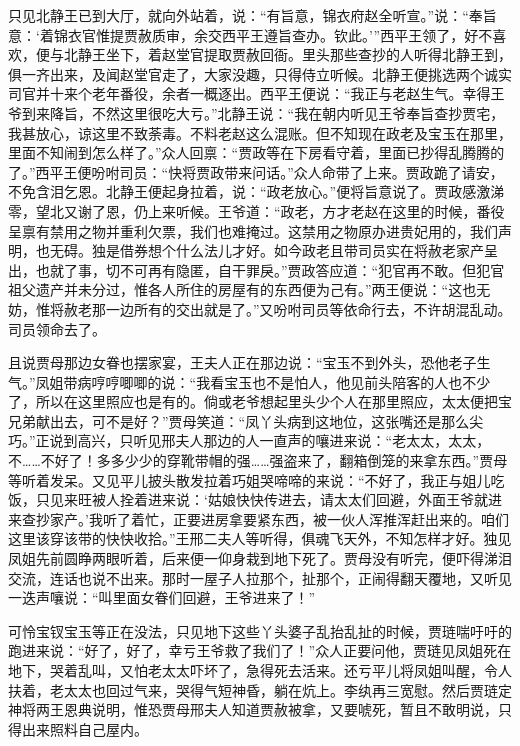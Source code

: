 \begin{parag}
    只见北静王已到大厅，就向外站着，说：“有旨意，锦衣府赵全听宣。”说：“奉旨意：‘着锦衣官惟提贾赦质审，余交西平王遵旨查办。钦此。’”西平王领了，好不喜欢，便与北静王坐下，着赵堂官提取贾赦回衙。里头那些查抄的人听得北静王到，俱一齐出来，及闻赵堂官走了，大家没趣，只得侍立听候。北静王便挑选两个诚实司官并十来个老年番役，余者一概逐出。西平王便说：“我正与老赵生气。幸得王爷到来降旨，不然这里很吃大亏。”北静王说：“我在朝内听见王爷奉旨查抄贾宅，我甚放心，谅这里不致荼毒。不料老赵这么混账。但不知现在政老及宝玉在那里，里面不知闹到怎么样了。”众人回禀：“贾政等在下房看守着，里面已抄得乱腾腾的了。”西平王便吩咐司员：“快将贾政带来问话。”众人命带了上来。贾政跪了请安，不免含泪乞恩。北静王便起身拉着，说：“政老放心。”便将旨意说了。贾政感激涕零，望北又谢了恩，仍上来听候。王爷道：“政老，方才老赵在这里的时候，番役呈禀有禁用之物并重利欠票，我们也难掩过。这禁用之物原办进贵妃用的，我们声明，也无碍。独是借券想个什么法儿才好。如今政老且带司员实在将赦老家产呈出，也就了事，切不可再有隐匿，自干罪戾。”贾政答应道：“犯官再不敢。但犯官祖父遗产并未分过，惟各人所住的房屋有的东西便为己有。”两王便说：“这也无妨，惟将赦老那一边所有的交出就是了。”又吩咐司员等依命行去，不许胡混乱动。司员领命去了。
\end{parag}


\begin{parag}
    且说贾母那边女眷也摆家宴，王夫人正在那边说：“宝玉不到外头，恐他老子生气。”凤姐带病哼哼唧唧的说：“我看宝玉也不是怕人，他见前头陪客的人也不少了，所以在这里照应也是有的。倘或老爷想起里头少个人在那里照应，太太便把宝兄弟献出去，可不是好？”贾母笑道：“凤丫头病到这地位，这张嘴还是那么尖巧。”正说到高兴，只听见邢夫人那边的人一直声的嚷进来说：“老太太，太太，不……不好了！多多少少的穿靴带帽的强……强盗来了，翻箱倒笼的来拿东西。”贾母等听着发呆。又见平儿披头散发拉着巧姐哭啼啼的来说：“不好了，我正与姐儿吃饭，只见来旺被人拴着进来说：‘姑娘快快传进去，请太太们回避，外面王爷就进来查抄家产。’我听了着忙，正要进房拿要紧东西，被一伙人浑推浑赶出来的。咱们这里该穿该带的快快收拾。”王邢二夫人等听得，俱魂飞天外，不知怎样才好。独见凤姐先前圆睁两眼听着，后来便一仰身栽到地下死了。贾母没有听完，便吓得涕泪交流，连话也说不出来。那时一屋子人拉那个，扯那个，正闹得翻天覆地，又听见一迭声嚷说：“叫里面女眷们回避，王爷进来了！”
\end{parag}


\begin{parag}
    可怜宝钗宝玉等正在没法，只见地下这些丫头婆子乱抬乱扯的时候，贾琏喘吁吁的跑进来说：“好了，好了，幸亏王爷救了我们了！”众人正要问他，贾琏见凤姐死在地下，哭着乱叫，又怕老太太吓坏了，急得死去活来。还亏平儿将凤姐叫醒，令人扶着，老太太也回过气来，哭得气短神昏，躺在炕上。李纨再三宽慰。然后贾琏定神将两王恩典说明，惟恐贾母邢夫人知道贾赦被拿，又要唬死，暂且不敢明说，只得出来照料自己屋内。
\end{parag}


